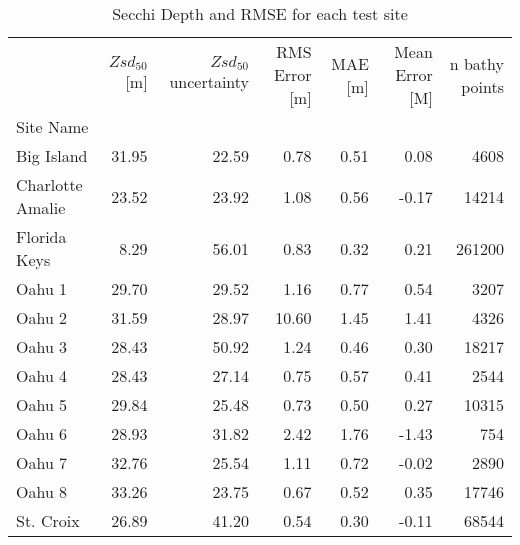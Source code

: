 \begin{table}
\centering
\caption{Secchi Depth and RMSE for each test site}
\label{tab:ocean_color_summary_by_site}
\begin{tabular}{lrrrrrr}
\toprule
{} &  $Zsd_{50}$[m] &  $Zsd_{50}$ uncertainty &  RMS Error [m] &  MAE [m] &  Mean Error [M] &  n bathy points \\
Site Name        &                &                         &                &          &                 &                 \\
\midrule
Big Island       &          31.95 &                   22.59 &           0.78 &     0.51 &            0.08 &            4608 \\
Charlotte Amalie &          23.52 &                   23.92 &           1.08 &     0.56 &           -0.17 &           14214 \\
Florida Keys     &           8.29 &                   56.01 &           0.83 &     0.32 &            0.21 &          261200 \\
Oahu 1           &          29.70 &                   29.52 &           1.16 &     0.77 &            0.54 &            3207 \\
Oahu 2           &          31.59 &                   28.97 &          10.60 &     1.45 &            1.41 &            4326 \\
Oahu 3           &          28.43 &                   50.92 &           1.24 &     0.46 &            0.30 &           18217 \\
Oahu 4           &          28.43 &                   27.14 &           0.75 &     0.57 &            0.41 &            2544 \\
Oahu 5           &          29.84 &                   25.48 &           0.73 &     0.50 &            0.27 &           10315 \\
Oahu 6           &          28.93 &                   31.82 &           2.42 &     1.76 &           -1.43 &             754 \\
Oahu 7           &          32.76 &                   25.54 &           1.11 &     0.72 &           -0.02 &            2890 \\
Oahu 8           &          33.26 &                   23.75 &           0.67 &     0.52 &            0.35 &           17746 \\
St. Croix        &          26.89 &                   41.20 &           0.54 &     0.30 &           -0.11 &           68544 \\
\bottomrule
\end{tabular}
\end{table}
